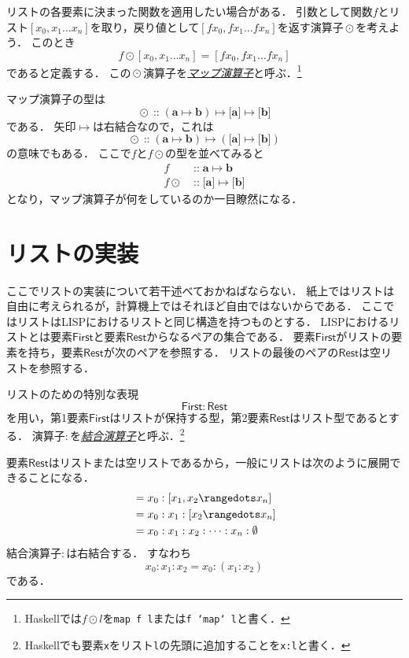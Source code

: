 \documentclass[twocolumn]{jsbook}
\newcommand{\keyword}[1]{\underline{\emph{#1}}}
\newcommand{\code}[1]{\texttt{#1}}
\newcommand{\hsklType}[1]{\textbf{#1}}
\DeclareMathOperator{\hsklMap}{\odot}
\DeclareMathOperator{\hsklOf}{::}
\newcommand{\hsklEmptyList}{\emptyset}
\newcommand{\hsklListType}[1]{\boldsymbol{[}#1\boldsymbol{]}}
\newcommand{\mathVarKeyword}[1]{\mathsf{#1}}
\DeclareMathOperator{\mathIn}{::}
\DeclareMathOperator{\mathMapsTo}{\mapsto}
\newcommand{\mathFirst}{\mathVarKeyword{First}}
\newcommand{\mathRest}{\mathVarKeyword{Rest}}
\newcommand{\mathMorph}[2]{#1\mathMapsTo#2}
\newcommand{\mathMorphII}[3]{#1\mathMapsTo#2\mathMapsTo#3}
\begin{document}
リストの各要素に決まった関数を適用したい場合がある．
引数として関数$f$とリスト$[x_0,x_1\dots x_n]$を取り，戻り値として$[fx_0,fx_1\dots fx_n]$を返す演算子$\hsklMap$を考えよう．
このとき$$f\hsklMap[x_0,x_1\dots x_n]=[fx_0,fx_1\dots fx_n]$$であると定義する．
この$\hsklMap$演算子を\keyword{マップ演算子}と呼ぶ．\footnote{Haskellでは$f\hsklMap l$を\code{map f l}または\code{f `map` l}と書く．}

マップ演算子の型は
$$\hsklMap\hsklOf{}\mathMorphII{(\mathMorph{\hsklType{a}}{\hsklType{b}})}{\hsklListType{\hsklType{a}}}{\hsklListType{\hsklType{b}}}$$
である．
矢印$\mathMapsTo$は右結合なので，これは$$\hsklMap\hsklOf{}\mathMorph{(\mathMorph{\hsklType{a}}{\hsklType{b}})}{(\mathMorph{\hsklListType{\hsklType{a}}}{\hsklListType{\hsklType{b}}})}$$の意味でもある．
ここで$f$と$f\hsklMap$の型を並べてみると
\begin{align*}
f&\mathIn\mathMorph{\hsklType{a}}{\hsklType{b}}\\
f\hsklMap&\mathIn\mathMorph{\hsklListType{\hsklType{a}}}{\hsklListType{\hsklType{b}}}
\end{align*}
となり，マップ演算子が何をしているのか一目瞭然になる．

\section{リストの実装}

ここでリストの実装について若干述べておかねばならない．
紙上ではリストは自由に考えられるが，計算機上ではそれほど自由ではないからである．
ここではリストはLISPにおけるリストと同じ構造を持つものとする．
LISPにおけるリストとは要素$\mathFirst$と要素$\mathRest$からなるペアの集合である．
要素$\mathFirst$がリストの要素を持ち，要素$\mathRest$が次のペアを参照する．
リストの最後のペアの$\mathRest$は空リストを参照する．

リストのための特別な表現$$\mathFirst:\mathRest$$を用い，第1要素$\mathFirst$はリストが保持する型，第2要素$\mathRest$はリスト型であるとする．
演算子$:$を\keyword{結合演算子}と呼ぶ．\footnote{Haskellでも要素\code{x}をリスト\code{l}の先頭に追加することを\code{x:l}と書く．}

要素$\mathRest$はリストまたは空リストであるから，一般にリストは次のように展開できることになる．
\begin{align*}
[x_0,x_1,x_2\rangedots x_n]&=x_0:[x_1,x_2\rangedots x_n]\\
&=x_0:x_1:[x_2\rangedots x_n]\\
&=x_0:x_1:x_2:\dots:x_n:\hsklEmptyList
\end{align*}
結合演算子$:$は右結合する．
すなわち$$x_0:x_1:x_2=x_0:(x_1:x_2)$$である．
\end{document}
